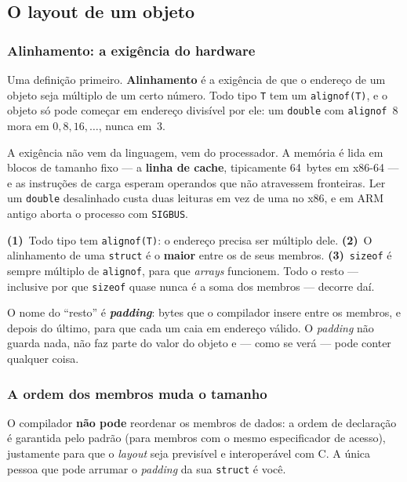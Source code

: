 \subsection{O layout de um objeto}
\label{sec:layout}

\subsubsection{Alinhamento: a exigência do hardware}

Uma definição primeiro. \textbf{Alinhamento} é a exigência de que o endereço de
um objeto seja múltiplo de um certo número. Todo tipo \texttt{T} tem um
\texttt{alignof(T)}, e o objeto só pode começar em endereço divisível por ele:
um \texttt{double} com \texttt{alignof}~8 mora em $0, 8, 16, \ldots$, nunca
em~3.

A exigência não vem da linguagem, vem do processador. A memória é lida em blocos
de tamanho fixo --- a \textbf{linha de cache}, tipicamente 64~bytes em x86-64
--- e as instruções de carga esperam operandos que não atravessem fronteiras.
Ler um \texttt{double} desalinhado custa duas leituras em vez de uma no x86, e
em ARM antigo aborta o processo com \texttt{SIGBUS}.

\begin{regra}
\textbf{(1)}~Todo tipo tem \texttt{alignof(T)}: o endereço precisa ser múltiplo
dele. \textbf{(2)}~O alinhamento de uma \texttt{struct} é o \textbf{maior} entre
os de seus membros. \textbf{(3)}~\texttt{sizeof} é sempre múltiplo de
\texttt{alignof}, para que \emph{arrays} funcionem. Todo o resto --- inclusive
por que \texttt{sizeof} quase nunca é a soma dos membros --- decorre daí.
\end{regra}

O nome do ``resto'' é \textbf{\emph{padding}}: bytes que o compilador insere
entre os membros, e depois do último, para que cada um caia em endereço válido.
O \emph{padding} não guarda nada, não faz parte do valor do objeto e --- como se
verá --- pode conter qualquer coisa.

\subsubsection{A ordem dos membros muda o tamanho}

\begin{porque}
O compilador \textbf{não pode} reordenar os membros de dados: a ordem de
declaração é garantida pelo padrão (para membros com o mesmo especificador de
acesso), justamente para que o \emph{layout} seja previsível e interoperável com
C. A única pessoa que pode arrumar o \emph{padding} da sua \texttt{struct} é
você.
\end{porque}

